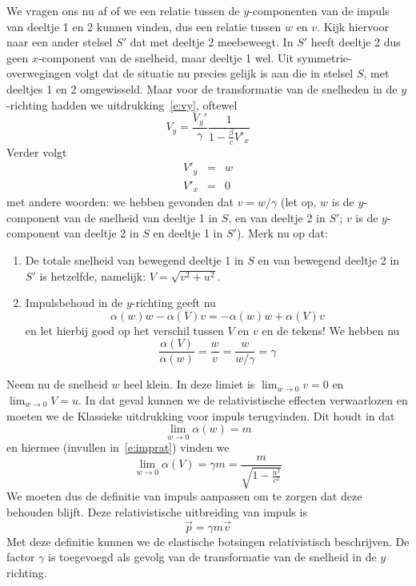 We vragen ons nu af of we een relatie tussen de $y$-componenten van de
impuls van deeltje 1 en 2 kunnen vinden, dus een relatie tussen $w$ en
$v$. Kijk hiervoor naar een ander stelsel $S'$ dat met deeltje 2
meebeweegt. In $S'$ heeft deeltje 2 dus geen $x$-component van de
snelheid, maar deeltje 1 wel. Uit symmetrie-overwegingen volgt dat de
situatie nu precies gelijk is aan die in stelsel $S$, met deeltjes 1
en 2 omgewisseld. Maar voor de transformatie van de snelheden in de
$y$-richting hadden we uitdrukking~\ref{e:vy}, oftewel
\begin{equation}
V_y = \frac{V_y'}{\gamma}\frac{1}{1-\frac{\beta}{c}V'_x}
\end{equation}
 Verder volgt
\begin{eqnarray}
V'_y & = & w \\
V'_x & = & 0
\end{eqnarray}
met andere woorden: we hebben gevonden dat $v=w/\gamma$ (let op, $w$
is de $y$-component van de snelheid van deeltje 1 in $S$, en van
deeltje 2 in $S'$; $v$ is de $y$-component van deeltje 2 in $S$ en deeltje 1 in $S'$).
Merk nu op dat:
\begin{enumerate}
\item De totale snelheid van bewegend deeltje 1 in $S$ en van bewegend deeltje 2 in $S'$ is hetzelfde, namelijk: $V=\sqrt{v^2+u^2}$.
\item Impulsbehoud in de $y$-richting geeft nu
\begin{equation}
\alpha(w) w - \alpha(V) v = -\alpha(w) w + \alpha(V) v
\end{equation}
en let hierbij goed op het verschil tussen $V$ en $v$ en de tekens! We hebben nu
\begin{equation}
\frac{\alpha(V)}{\alpha(w)} = \frac{w}{v} = \frac{w}{w/\gamma} = \gamma \label{e:imprat}
\end{equation}
\end{enumerate}
Neem nu de snelheid $w$ heel klein. In deze limiet is
$\lim_{w\rightarrow 0} v = 0$ en $\lim_{w\rightarrow 0} V = u$. In dat
geval kunnen we de relativistische effecten verwaarlozen en moeten we
de Klassieke uitdrukking voor impuls terugvinden. Dit houdt in dat 
\begin{equation}
\lim_{w\rightarrow 0} \alpha(w) = m 
\end{equation}
en hiermee (invullen in~\ref{e:imprat}) vinden we
\begin{equation}
\lim_{w\rightarrow 0} \alpha(V) = \gamma m = \frac{m}{\sqrt{1-\frac{u^2}{c^2}}}
\end{equation}
We moeten dus de definitie van impuls aanpassen om te zorgen dat deze behouden blijft. Deze relativistische
uitbreiding van impuls is
\begin{equation}\label{e:impuls}
\vec{p} = \gamma m \vec{v}
\end{equation}
Met deze definitie kunnen we de elastische botsingen relativistisch beschrijven. De factor $\gamma$ 
is toegevoegd als gevolg van de transformatie van de snelheid in de $y$ richting.
